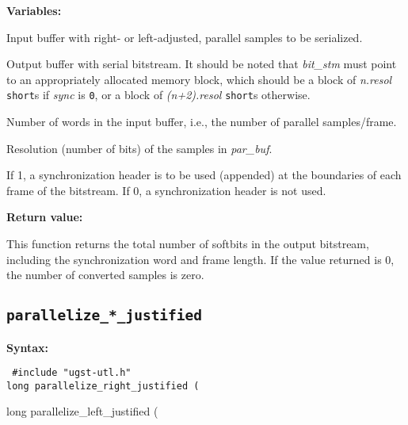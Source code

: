 {\bf Variables: }
\begin{Descr}{\DescrLen}
\item[\pbox{20mm}{\em par\_buf}] %
                    Input buffer with right- or left-adjusted,
                    parallel samples to be serialized.

\item[\pbox{20mm}{\em bit\_stm}] %
                    Output buffer with serial bitstream. It should be
                    noted that {\em bit\_stm} must point to an
                    appropriately allocated memory block, which should
                    be a block of {\em n.resol} {\tt short}s if {\em
                    sync} is {\tt 0}, or a block of {\em (n+2).resol}
                    {\tt short}s otherwise.

\item[\pbox{20mm}{\em n}] %
                    Number of words in the input buffer, i.e., the number of
                parallel samples/frame.

\item[\pbox{20mm}{\em resol}] %
                    Resolution (number of bits) of the samples
                    in {\em par\_buf}.

\item[\pbox{20mm}{\em sync}] %
                    If 1, a synchronization header is to be used (appended) at
                    the boundaries of each frame of the bitstream. If
                    0, a synchronization header is not used.
\end{Descr}


{\bf Return value: }

This function returns the total number of softbits in the output
bitstream, including the synchronization word and frame length. If the
value returned is 0, the number of converted samples is zero.


\subsection{{\tt parallelize\_*\_justified}}

{\bf Syntax: }

{\tt
\#include "ugst-utl.h"\\
long parallelize\_right\_justified \hfill
         (

long parallelize\_left\_justified \hfill
         (
}

